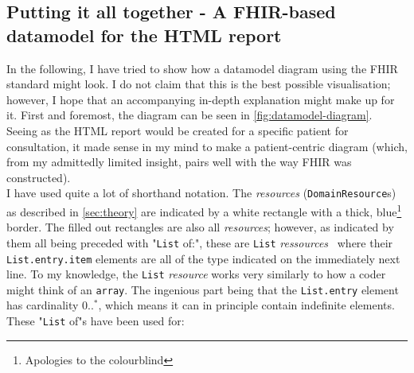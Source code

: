 \subsection{Putting it all together - A FHIR-based datamodel for the HTML report}
In the following, I have tried to show how a datamodel diagram using the FHIR standard might look. I do not claim that this is the best possible visualisation; however, I hope that an accompanying in-depth explanation might make up for it.  First and foremost, the diagram can be seen in \autoref{fig:datamodel-diagram}.
\\
Seeing as the HTML report would be created for a specific patient for consultation, it made sense in my mind to make a patient-centric diagram (which, from my admittedly limited insight, pairs well with the way FHIR was constructed).
\\
I have used quite a lot of shorthand notation. The \emph{resources} (\texttt{DomainResource}s) as described in \autoref{sec:theory} are indicated by a white rectangle with a thick, blue\footnote{Apologies to the colourblind} border. The filled out rectangles are also all \emph{resources}; however, as indicated by them all being preceded with "\texttt{List} of:", these are \texttt{List} \emph{ressources}~\cite{FHIR-List-resource} where their \texttt{List.entry.item} elements are all of the type indicated on the immediately next line. To my knowledge, the \texttt{List} \emph{resource} works very similarly to how a coder might think of an \texttt{array}. The ingenious part being that the \texttt{List.entry} element has cardinality $0..^\ast$, which means it can in principle contain indefinite elements. These "\texttt{List} of"s have been used for:
